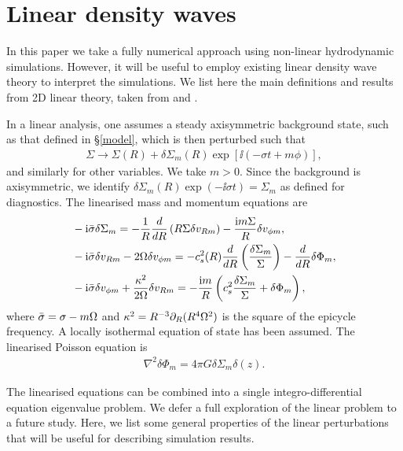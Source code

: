 \section{Linear density waves}\label{wkb}
In this paper we take a fully numerical approach using non-linear
hydrodynamic simulations. However, it will be useful to employ
existing linear density wave theory to interpret the simulations.
We list here the main definitions and results from 2D linear theory,
taken from \cite{lin11b} and \cite{shu91}.  

In a linear analysis, one assumes a steady axisymmetric background state, such as
that defined in \S\ref{model}, which is then perturbed such that
\begin{align}  
  \Sigma \to \Sigma(R) + \delta\Sigma_m(R)\exp{\left[\ii\left(-\sigma t +
        m\phi\right)\right]}, 
\end{align}
and similarly for other variables. We take $m>0$. Since the background is
axisymmetric, we identify $\delta\Sigma_m(R)\exp{\left(-\ii\sigma
    t\right)} = \Sigma_m$ as defined for diagnostics. 
The linearised mass and momentum equations are
\begin{align}
  &-\mathrm{i}\bar{\sigma} \delta\Sigma_m = -\frac{1}{R}\frac{d}{dR}\left(R\Sigma\delta
    v_{Rm}\right) - \frac{\mathrm{i} m \Sigma}{R}\delta v_{\phi m}, \\
  &-\mathrm{i}\bar{\sigma}\delta v_{Rm} - 2\Omega \delta v_{\phi m} = -
  c_s^2(R)\frac{d}{dR}\left(\frac{\delta\Sigma_m}{\Sigma}\right) - \frac{d}{dR}\delta\Phi_m,\\
  & -\mathrm{i}\bar{\sigma}\delta v_{\phi m} + \frac{\kappa^2}{2\Omega}\delta v_{Rm} =
  -\frac{\mathrm{i} m }{R}\left(c_s^2\frac{\delta\Sigma_m}{\Sigma} + \delta\Phi_m\right),
\end{align}
where $\bar{\sigma} = \sigma - m\Omega$ and $\kappa^2 =
R^{-3}\partial_R(R^4\Omega^2)$ is the square of the epicycle frequency. A
locally isothermal equation of state has been assumed.    
The linearised Poisson equation is 
\begin{align}
  \nabla^2\delta\Phi_m = 4\pi G \delta\Sigma_m \delta(z). 
\end{align}

The linearised equations can be combined into a single
integro-differential equation eigenvalue problem. We defer a full
exploration of the linear problem to a future study. Here, we list some
general  properties of the linear perturbations that will be useful
for describing simulation results. 


